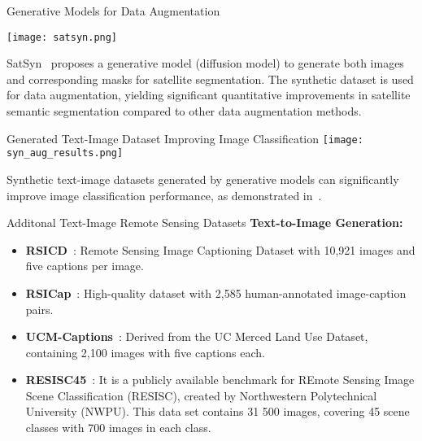 \begin{refsection}
  \begin{frame}{Generative Models for Data Augmentation}
    \begin{minipage}{0.7\linewidth}
      \texttt{[image: satsyn.png]}
    \end{minipage}%
    \hfill
    \begin{minipage}{0.3\linewidth}
      \scriptsize
      SatSyn~\parencite{tokerSatSynthAugmentingImageMask2024} proposes a generative model (diffusion model) to generate both images and corresponding masks for satellite segmentation. The synthetic dataset is used for data augmentation, yielding significant quantitative improvements in satellite semantic segmentation compared to other data augmentation methods.
    \end{minipage}
    \bottomleftrefs
  \end{frame}
\end{refsection}

\begin{refsection}
  \begin{frame}{Generated Text-Image Dataset Improving Image Classification}
    \centering
    \texttt{[image: syn\_aug\_results.png]}
    
    
    \scriptsize
    Synthetic text-image datasets generated by generative models can significantly improve image classification performance, as demonstrated in~\parencite{heSYNTHETICDATAGENERATIVE2022}.
    \bottomleftrefs
  \end{frame}
\end{refsection}

  \begin{refsection}
    \begin{frame}{Additonal Text-Image Remote Sensing Datasets}
      \textbf{Text-to-Image Generation:}
      \begin{itemize}
        \item \textbf{RSICD}~\parencite{lu2017exploring}: Remote Sensing Image Captioning Dataset with 10,921 images and five captions per image.
        \item \textbf{RSICap}~\parencite{hu2023rsgpt}: High-quality dataset with 2,585 human-annotated image-caption pairs.
        \item \textbf{UCM-Captions}~\parencite{qu2016deep}: Derived from the UC Merced Land Use Dataset, containing 2,100 images with five captions each.
        \item \textbf{RESISC45}~\parencite{Cheng2017}: It is a publicly available benchmark for REmote Sensing Image Scene Classification (RESISC), created by Northwestern Polytechnical University (NWPU). This data set contains 31 500 images, covering 45 scene classes with 700 images in each class.
      \end{itemize}
      \bottomleftrefs
    \end{frame}
  \end{refsection}

